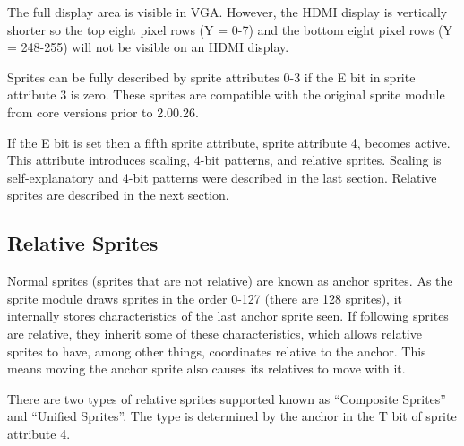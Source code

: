 The full display area is visible in VGA. However, the HDMI display is
vertically shorter so the top eight pixel rows (Y = 0-7) and the
bottom eight pixel rows (Y = 248-255) will not be visible on an HDMI
display.

Sprites can be fully described by sprite attributes 0-3 if the E bit
in sprite attribute 3 is zero. These sprites are compatible with the
original sprite module from core versions prior to 2.00.26.

If the E bit is set then a fifth sprite attribute, sprite attribute 4,
becomes active. This attribute introduces scaling, 4-bit patterns, and
relative sprites. Scaling is self-explanatory and 4-bit patterns were
described in the last section. Relative sprites are described in the
next section.

\subsection{Relative Sprites}
Normal sprites (sprites that are not relative) are known as anchor
sprites. As the sprite module draws sprites in the order 0-127 (there
are 128 sprites), it internally stores characteristics of the last
anchor sprite seen. If following sprites are relative, they inherit
some of these characteristics, which allows relative sprites to have,
among other things, coordinates relative to the anchor. This means
moving the anchor sprite also causes its relatives to move with it.

There are two types of relative sprites supported known as “Composite
Sprites” and “Unified Sprites”. The type is determined by the anchor
in the T bit of sprite attribute 4.

